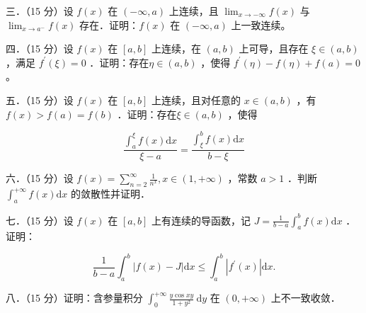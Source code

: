 \documentclass{article}
\begin{document}
三．（15 分）设 \(f(x)\) 在 \((-\infty, a)\) 上连续，且 \(\lim _{x \rightarrow-\infty} f(x)\) 与 \(\lim _{x \rightarrow a^{-}} f(x)\) 存在．证明：\(f(x)\) 在 \((-\infty, a)\) 上一致连续。

四．（15 分）设 \(f(x)\) 在 \([a, b]\) 上连续，在 \((a, b)\) 上可导，且存在 \(\xi \in(a, b)\) ，满足 \(f^{\prime}(\xi)=0\) ．证明：存在\(\eta \in(a, b)\) ，使得 \(f^{\prime}(\eta)-f(\eta)+f(a)=0\) 。

五．（15 分）设 \(f(x)\) 在 \([a, b]\) 上连续，且对任意的 \(x \in(a, b)\) ，有 \(f(x)>f(a)=f(b)\) ．证明：存在\(\xi \in(a, b)\) ，使得

\[
\frac{\int_{a}^{\xi} f(x) \mathrm{d} x}{\xi-a}=\frac{\int_{\xi}^{b} f(x) \mathrm{d} x}{b-\xi}
\]

六．（15 分）设 \(f(x)=\sum_{n=2}^{\infty} \frac{1}{n^{x}}, x \in(1,+\infty)\) ，常数 \(a>1\) ．判断 \(\int_{a}^{+\infty} f(x) \mathrm{d} x\) 的敛散性并证明．

七．（15 分）设 \(f(x)\) 在 \([a, b]\) 上有连续的导函数，记 \(J=\frac{1}{b-a} \int_{a}^{b} f(x) \mathrm{d} x\) ．证明：

\[
\frac{1}{b-a} \int_{a}^{b}|f(x)-J| \mathrm{d} x \leq \int_{a}^{b}\left|f^{\prime}(x)\right| \mathrm{d} x .
\]

八．（15 分）证明：含参量积分 \(\int_{0}^{+\infty} \frac{y \cos x y}{1+y^{2}} \mathrm{~d} y\) 在 \((0,+\infty)\) 上不一致收敛．
\end{document}
